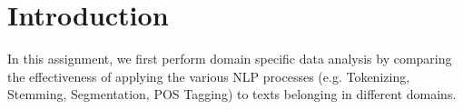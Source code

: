 \documentclass[sigconf,nonacm=true]{acmart}
\begin{document}
\author{Lim Jun Hong}

\author{Tammy Lim Lee Xin}

\author{Lee Han Wei}

\author{Pang Yu Shao}







\maketitle

\section{Introduction}
In this assignment, we first perform domain specific data analysis by comparing the effectiveness of applying the various NLP processes (e.g. Tokenizing, Stemming, Segmentation, POS Tagging) to texts belonging in different domains. 
\end{document}
